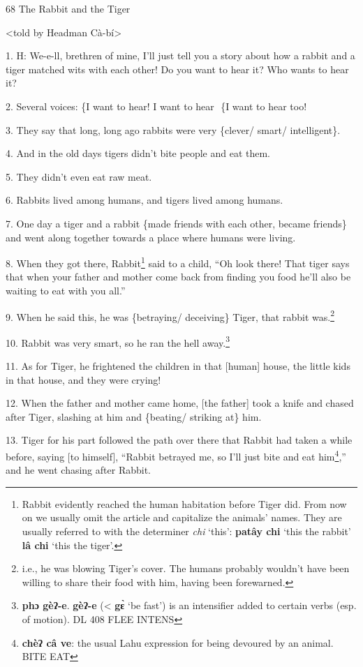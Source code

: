 
68 The Rabbit and the Tiger

<told by Headman Cà-bí>

1. H: We-e-ll, brethren of mine, I'll just tell you a story about how a rabbit
and a tiger matched wits with each other! Do you want to hear it? Who wants to
hear it?

2. Several voices: \{I want to hear! I want to hear          \{I want to hear
too!

3. They say that long, long ago rabbits were very \{clever/ smart/ intelligent\}.

4. And in the old days tigers didn't bite people and eat them.

5. They didn't even eat raw meat.

6. Rabbits lived among humans, and tigers lived among humans.

7. One day a tiger and a rabbit \{made friends with each other, became friends\}
and went along together towards a place where humans were living.

8. When they got there, Rabbit\footnote{Rabbit evidently reached the human habitation before Tiger did. From now on we usually omit the article and capitalize the animals' names. They are usually referred to with the determiner \textit{chi} `this': \textbf{patây chi} `this the rabbit'\textbf{ lâ chi} `this the tiger'.} said to a child, ``Oh look there! That tiger
says that when your father and mother come back from finding you food he'll also
be waiting to eat with you all.''

9. When he said this, he was \{betraying/ deceiving\} Tiger, that rabbit was.\footnote{i.e., he was blowing Tiger's cover. The humans probably wouldn't have been willing to share their food with him, having been forewarned.}

10. Rabbit was very smart, so he ran the hell away.\footnote{\textbf{ phɔ  gèʔ-e}. \textbf{gèʔ-e }(< \textbf{gɛ̀} `be fast') is an intensifier added to certain verbs (esp. of motion). DL 408 FLEE INTENS}

11. As for Tiger, he frightened the children in that [human] house, the little
kids in that house, and they were crying!

12. When the father and mother came home, [the father] took a knife and chased
after Tiger, slashing at him and \{beating/ striking at\} him.

13. Tiger for his part followed the path over there that Rabbit had taken a while
before, saying [to himself], ``Rabbit betrayed me, so I'll just bite and eat him\footnote{\textbf{chèʔ câ ve}: the usual Lahu expression for being devoured by an animal. BITE EAT},''
and he went chasing after Rabbit.

